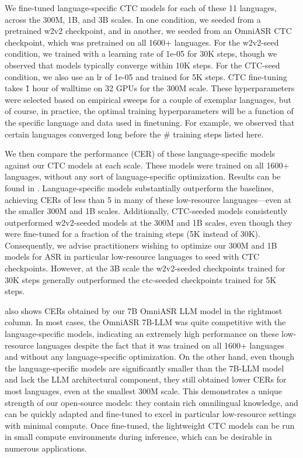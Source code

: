 We fine-tuned language-specific CTC models for each of these 11 languages, across the 300M, 1B, and 3B scales. In one condition, we seeded from a pretrained w2v2 checkpoint, and in another, we seeded from an OmniASR CTC checkpoint, which was pretrained on all 1600+ languages. For the w2v2-seed condition, we trained with a learning rate of 1e-05 for 30K steps, though we observed that models typically converge within 10K steps. For the CTC-seed condition, we also use an lr of 1e-05 and trained for 5K steps. CTC fine-tuning takes \~1 hour of walltime on 32 GPUs for the 300M scale. These hyperparameters were selected based on empirical sweeps for a couple of exemplar languages, but of course, in practice, the optimal training hyperparameters will be a function of the specific language and data used in finetuning. For example, we observed that certain languages converged long before the \# training steps listed here.

We then compare the performance (CER) of these language-specific models against our \OmniASR CTC models at each scale. These \OmniASR models were trained on all 1600+ languages, without any sort of language-specific optimization. Results can be found in . Language-specific models substantially outperform the \OmniASR baselines, achieving CERs of less than 5 in many of these low-resource languages—even at the smaller 300M and 1B scales. Additionally, CTC-seeded models consistently outperformed w2v2-seeded models at the 300M and 1B scales, even though they were fine-tuned for a fraction of the training steps (5K instead of 30K). Consequently, we advise practitioners wishing to optimize our 300M and 1B models for ASR in particular low-resource languages to seed with CTC checkpoints. However, at the 3B scale the w2v2-seeded checkpoints trained for 30K steps generally outperformed the ctc-seeded checkpoints trained for 5K steps.

 also shows CERs obtained by our 7B OmniASR LLM model in the rightmost column. In most cases, the OmniASR 7B-LLM was quite competitive with the language-specific models, indicating an extremely high performance on these low-resource languages despite the fact that it was trained on all 1600+ languages and without any language-specific optimization. On the other hand, even though the language-specific models are significantly smaller than the 7B-LLM model and lack the LLM architectural component, they still obtained lower CERs for most languages, even at the smallest 300M scale. This demonstrates a unique strength of our open-source \OmniASR models: they contain rich omnilingual knowledge, and can be quickly adapted and fine-tuned to excel in particular low-resource settings with minimal compute. Once fine-tuned, the lightweight CTC models can be run in small compute environments during inference, which can be desirable in numerous applications.

